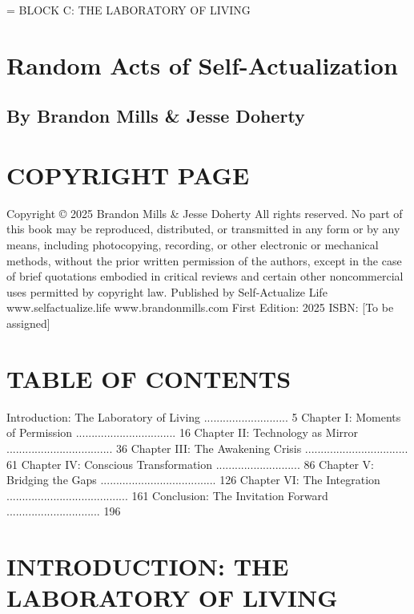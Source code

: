 = BLOCK C: THE LABORATORY OF LIVING

\chapter{Random Acts of Self-Actualization}

\section{By Brandon Mills \& Jesse Doherty}

\cleardoublepage

\chapter{COPYRIGHT PAGE}

Copyright © 2025 Brandon Mills \& Jesse Doherty
All rights reserved.
No part of this book may be reproduced, distributed, or transmitted in any form or by any means, including photocopying, recording, or other electronic or mechanical methods, without the prior written permission of the authors, except in the case of brief quotations embodied in critical reviews and certain other noncommercial uses permitted by copyright law.
Published by Self-Actualize Life
www.selfactualize.life
www.brandonmills.com
First Edition: 2025
ISBN: [To be assigned]

\cleardoublepage

\chapter{TABLE OF CONTENTS}

Introduction: The Laboratory of Living ........................... 5
Chapter I: Moments of Permission ................................ 16
Chapter II: Technology as Mirror .................................. 36
Chapter III: The Awakening Crisis ................................. 61
Chapter IV: Conscious Transformation ........................... 86
Chapter V: Bridging the Gaps ..................................... 126
Chapter VI: The Integration ....................................... 161
Conclusion: The Invitation Forward .............................. 196

\cleardoublepage

\chapter{INTRODUCTION: THE LABORATORY OF LIVING}


